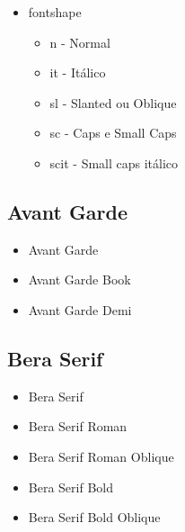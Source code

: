 \begin{itemize}
        \item fontshape
            \begin{itemize}
                \item n - Normal
                \item it - Itálico
                \item sl - Slanted ou Oblique
                \item sc - Caps e Small Caps
                \item scit - Small caps itálico
            \end{itemize}

    \end{itemize}


    \subsection{Avant Garde}
    \begin{itemize}
        \item {\selectfont Avant Garde}
        \item {\selectfont Avant Garde Book}
        \item {\selectfont Avant Garde Demi}
    \end{itemize}


    \subsection{Bera Serif}
    \begin{itemize}
        \item {\selectfont Bera Serif}
        \item {\selectfont Bera Serif Roman}
        \item {\selectfont Bera Serif Roman Oblique}
        \item {\selectfont Bera Serif Bold}
        \item {\selectfont Bera Serif Bold Oblique}
    \end{itemize}

